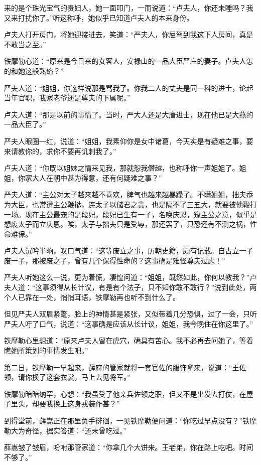 \documentclass[12pt,oneside]{book}
\begin{document}
来的是个珠光宝气的贵妇人，她一面叩门，一而说道：``卢夫人，你还未睡吗？我又来打扰你了。''听这称呼，她似乎已知道卢夫人的本来身份。

卢夫人打开房门，将她迎接进去，笑道：``严夫人，你屈驾到我这下人房间，真是不敢当之至。''

铁摩勒心道：``原来是今日来的女客人，安禄山的一品大臣严庄的妻子。卢夫人怎的和她这般熟络？''

严夫人道：``姐姐，你这样说那是骂我了。你我二人的丈夫是同一科的进士，论起当年官职，我家老爷还是尊夫的下属呢。''

卢夫人道：``那是以前的事情了。当时，严大人还是大唐进士，现在他已是大燕的一品大臣了。''

严夫人眼圈一红，说道：``姐姐，我素仰你是女中诸葛，今天实是有疑难之事，要来请教你的，求你不要再讥刺我了。''

卢夫人道：``你既以姐妹之情来见我，那就恕我僭越，也称呼你一声姐姐了。姐姐，你家大人在朝中甚为得意，还有何疑难之事？''

严夫人道：``主公对太子越来越不喜欢，脾气也越来越暴躁了。不瞒姐姐，拙夫忝为大臣，也常遭主公鞭挞，连太子以储君之贵，也是隔不了三五大，就要被他鞭打一场。现在主公最宠的是段妃，段妃已生有一子，名唤庆恩，窥主公之意，似乎是想废太子而立庆恩。唉，太子与拙夫只是受辱，那还罢了，只恐还有不测之祸，性命难保。''

卢夫人沉吟半晌，叹口气道：``这等废立之事，历朝史籍，颇有记载。自古立一子废一子，那被废之子，曾有几个保得性命的？这事确是难怪尊夫过虑！''

严夫人听她这么一说，更为着慌，凄惶问道：``姐姐，既然如此，你何以教我？''卢夫人道：``这事须得从长计议，有是有个法子，只不知你敢不敢行？''说到此处，两个人已靠在一处，悄悄耳语，铁摩勒再也听不到什么了。

但见严夫人双眉紧蹩，脸上的神情甚是紧张，又似带着几分恐惧，过了一会，只听严夫人吁了口气，说道：``这事确是应该从长计议，姐姐，我今晚住在你这里了。''

铁摩勒心里想道：``原来卢夫人留在虎穴，确具有苦心。我不必再去问她了，等着瞧她所策划的事情发生吧。''

第二日，铁摩勒一早起来，薛府的管家就将一套官佐的服饰拿来，说道：``王佐领，请你换了这套衣裳，马上去见将军。''

铁摩勒暗暗纳罕，心想：``我虽受了他亲兵佐领之职，但又不是出发去打仗，在屋子里头，却要我换上这身戎装作甚？''

到得堂前，薛嵩正在那里负手徘徊，一见铁摩勒便问道：``你吃过早点没有？''铁摩勒大为奇怪，据实答道：``还未曾吃过。''

薛嵩皱了皱眉，吩咐那管家道：``你拿几个大饼来。王老弟，你在路上吃吧。时间不够了。''
\end{document}

